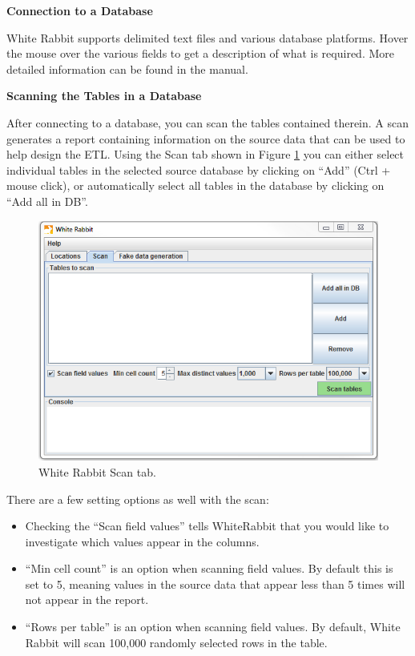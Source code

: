 \documentclass[11pt]{book}
\providecommand{\tightlist}{%
  \setlength{\itemsep}{0pt}\setlength{\parskip}{0pt}}
\theoremstyle{definition}
\theoremstyle{definition}
\theoremstyle{definition}
\theoremstyle{remark}
\begin{document}
\textbf{Connection to a Database}

White Rabbit supports delimited text files and various database platforms. Hover the mouse over the various fields to get a description of what is required. More detailed information can be found in the manual.

\textbf{Scanning the Tables in a Database}

After connecting to a database, you can scan the tables contained therein. A scan generates a report containing information on the source data that can be used to help design the ETL. Using the Scan tab shown in Figure \ref{fig:WhiteRabbitAddTables} you can either select individual tables in the selected source database by clicking on ``Add'' (Ctrl + mouse click), or automatically select all tables in the database by clicking on ``Add all in DB''.

\begin{figure}
\includegraphics[width=1\linewidth]{images/ExtractTransformLoad/WhiteRabbitAddTables} \caption{White Rabbit Scan tab.}\label{fig:WhiteRabbitAddTables}
\end{figure}

There are a few setting options as well with the scan:

\begin{itemize}
\tightlist
\item
  Checking the ``Scan field values'' tells WhiteRabbit that you would like to investigate which values appear in the columns.
\item
  ``Min cell count'' is an option when scanning field values. By default this is set to 5, meaning values in the source data that appear less than 5 times will not appear in the report.
\item
  ``Rows per table'' is an option when scanning field values. By default, White Rabbit will scan 100,000 randomly selected rows in the table.
\end{itemize}
\end{document}
